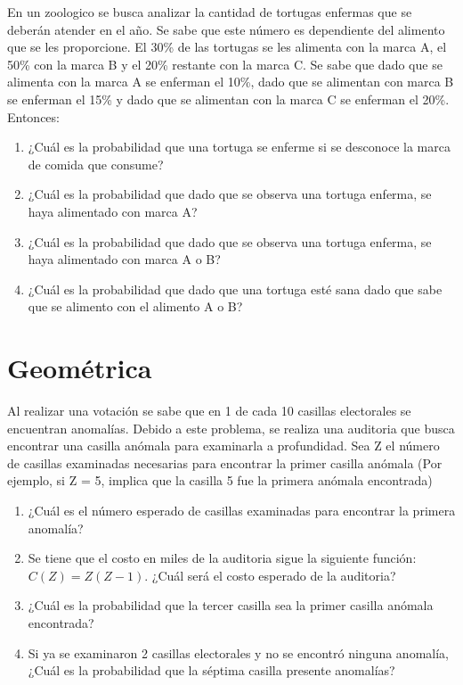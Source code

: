 \documentclass[addpoints]{exam}
\theoremstyle{mytheor}
\begin{document}
\begin{questions}
\question En un zoologico se busca analizar la cantidad de tortugas enfermas que se deberán atender en el año. Se sabe que este número es dependiente del alimento que se les proporcione. El 30\% de las tortugas se les alimenta con la marca A, el 50\% con la marca B y el 20\% restante con la marca C. Se sabe que dado que se alimenta con la marca A se enferman el 10\%, dado que se alimentan con marca B se enferman el 15\% y dado que se alimentan con la marca C se enferman el 20\%. Entonces:
\begin{enumerate}
\item ¿Cuál es la probabilidad que una tortuga se enferme si se desconoce la marca de comida que consume?
\item ¿Cuál es la probabilidad que dado que se observa una tortuga enferma, se haya alimentado con marca A?
\item ¿Cuál es la probabilidad que dado que se observa una tortuga enferma, se haya alimentado con marca A o B?
\item ¿Cuál es la probabilidad que dado que una tortuga esté sana dado que sabe que se alimento con el alimento A o B?
\end{enumerate}

  \section*{Geométrica}
  
  \question Al realizar una votación se sabe que en 1 de cada 10 casillas electorales se encuentran anomalías. Debido a este problema, se realiza una auditoria que busca encontrar una casilla anómala para examinarla a profundidad. Sea Z el número de casillas examinadas necesarias para encontrar la primer casilla anómala (Por ejemplo, si Z = 5, implica que la casilla 5 fue la primera anómala encontrada)
   \begin{enumerate}
   \item ¿Cuál es el número esperado de casillas examinadas para encontrar la primera anomalía? 
   
   \item Se tiene que el costo en miles de la auditoria sigue la siguiente función: $C(Z)=Z(Z-1)$. ¿Cuál será el costo esperado de la auditoria?
   
   \item ¿Cuál es la probabilidad que la tercer casilla sea la primer casilla anómala encontrada?
   
   \item Si ya se examinaron 2 casillas electorales y no se encontró ninguna anomalía, ¿Cuál es la probabilidad que la séptima casilla presente anomalías?


\end{enumerate}
\end{questions}
\end{document}
